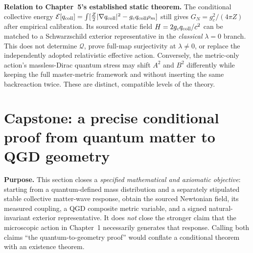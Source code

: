 \documentclass[11pt,a4paper]{article}
\theoremstyle{remark}\newtheorem{remark}[theorem]{Remark}
\begin{document}
\textbf{Relation to Chapter~5's established static theorem.}
The conditional collective energy
$\mathcal E[q_{\rm coll}]=\int[\tfrac Z2|\nabla q_{\rm coll}|^2
-g_cq_{\rm coll}\rho_m]$ still gives
$G_N=g_c^2/(4\pi Z)$ after empirical calibration.
Its sourced static field $H=2g_cq_{\rm coll}/c^2$
can be matched to a Schwarzschild exterior representative in the
\emph{classical} $\lambda=0$ branch. This does not determine
$\mathcal Q$, prove full-map surjectivity at $\lambda\neq0$, or
replace the independently adopted relativistic effective action.
Conversely, the metric-only action's massless-Dirac quantum stress
may shift $A^2$ and $B^2$ differently while keeping the full
master-metric framework and without inserting the same backreaction
twice. These are distinct, compatible levels of the theory.

\section{Capstone: a precise conditional proof from quantum matter to QGD geometry}\label{sec:v30-capstone}
\textbf{Purpose.} This section closes a \emph{specified mathematical and axiomatic objective}: starting from a quantum-defined mass distribution and a separately stipulated stable collective matter-wave response, obtain the sourced Newtonian field, its measured coupling, a QGD composite metric variable, and a signed natural-invariant exterior representative. It does \emph{not} close the stronger claim that the microscopic action in Chapter~1 necessarily generates that response. Calling both claims ``the quantum-to-geometry proof'' would conflate a conditional theorem with an existence theorem.
\end{document}
